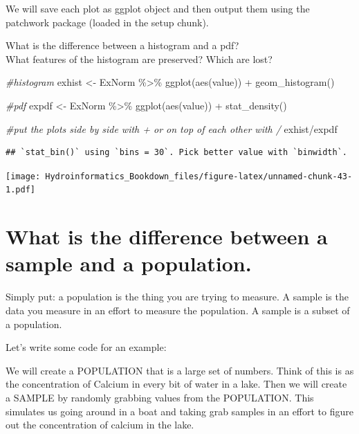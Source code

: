 \documentclass[
]{book}
\newenvironment{Shaded}{\begin{snugshade}}{\end{snugshade}}
\newcommand{\CommentTok}[1]{\textcolor[rgb]{0.56,0.35,0.01}{\textit{#1}}}
\newcommand{\FunctionTok}[1]{\textcolor[rgb]{0.00,0.00,0.00}{#1}}
\newcommand{\NormalTok}[1]{#1}
\newcommand{\OtherTok}[1]{\textcolor[rgb]{0.56,0.35,0.01}{#1}}
\newcommand{\SpecialCharTok}[1]{\textcolor[rgb]{0.00,0.00,0.00}{#1}}
\begin{document}
We will save each plot as ggplot object and then output them using the patchwork package (loaded in the setup chunk).

What is the difference between a histogram and a pdf?\\
What features of the histogram are preserved? Which are lost?

\begin{Shaded}
\begin{Highlighting}[]
\CommentTok{\#histogram}
\NormalTok{exhist }\OtherTok{\textless{}{-}}\NormalTok{ ExNorm }\SpecialCharTok{\%\textgreater{}\%}
  \FunctionTok{ggplot}\NormalTok{(}\FunctionTok{aes}\NormalTok{(value)) }\SpecialCharTok{+}
  \FunctionTok{geom\_histogram}\NormalTok{()}

\CommentTok{\#pdf}
\NormalTok{expdf }\OtherTok{\textless{}{-}}\NormalTok{ ExNorm }\SpecialCharTok{\%\textgreater{}\%}
  \FunctionTok{ggplot}\NormalTok{(}\FunctionTok{aes}\NormalTok{(value)) }\SpecialCharTok{+}
  \FunctionTok{stat\_density}\NormalTok{()}

\CommentTok{\#put the plots side by side with + or on top of each other with /}
\NormalTok{exhist}\SpecialCharTok{/}\NormalTok{expdf}
\end{Highlighting}
\end{Shaded}

\begin{verbatim}
## `stat_bin()` using `bins = 30`. Pick better value with `binwidth`.
\end{verbatim}

\texttt{[image: Hydroinformatics\_Bookdown\_files/figure-latex/unnamed-chunk-43-1.pdf]}

\hypertarget{what-is-the-difference-between-a-sample-and-a-population.}{%
\section{What is the difference between a sample and a population.}\label{what-is-the-difference-between-a-sample-and-a-population.}}

Simply put: a population is the thing you are trying to measure. A sample is the data you measure in an effort to measure the population. A sample is a subset of a population.

Let's write some code for an example:

We will create a POPULATION that is a large set of numbers. Think of this is as the concentration of Calcium in every bit of water in a lake. Then we will create a SAMPLE by randomly grabbing values from the POPULATION. This simulates us going around in a boat and taking grab samples in an effort to figure out the concentration of calcium in the lake.
\end{document}
